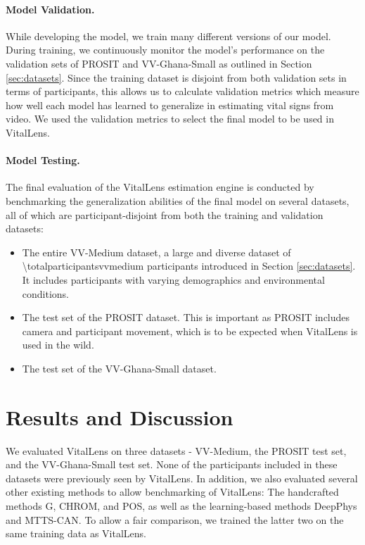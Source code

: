 \documentclass{article}
\begin{document}
\paragraph{Model Validation.}
While developing the model, we train many different versions of our model.
During training, we continuously monitor the model's performance on the validation sets of PROSIT and VV-Ghana-Small as outlined in Section \ref{sec:datasets}.
Since the training dataset is disjoint from both validation sets in terms of participants, this allows us to calculate validation metrics which measure how well each model has learned to generalize in estimating vital signs from video.
We used the validation metrics to select the final model to be used in VitalLens.

\paragraph{Model Testing.}
The final evaluation of the VitalLens estimation engine is conducted by benchmarking the generalization abilities of the final model on several datasets, all of which are participant-disjoint from both the training and validation datasets:

\begin{itemize}
	\item The entire VV-Medium dataset, a large and diverse dataset of \num{\totalparticipantsvvmedium} participants introduced in Section \ref{sec:datasets}. It includes participants with varying demographics and environmental conditions.
	\item The test set of the PROSIT dataset. This is important as PROSIT includes camera and participant movement, which is to be expected when VitalLens is used in the wild.
	\item The test set of the VV-Ghana-Small dataset.
\end{itemize}

\section{Results and Discussion}
\label{sec:results}

We evaluated VitalLens on three datasets - VV-Medium, the PROSIT test set, and the VV-Ghana-Small test set.
None of the participants included in these datasets were previously seen by VitalLens.
In addition, we also evaluated several other existing methods to allow benchmarking of VitalLens:
The handcrafted methods G, CHROM, and POS, as well as the learning-based methods DeepPhys and MTTS-CAN.
To allow a fair comparison, we trained the latter two on the same training data as VitalLens.
\end{document}
